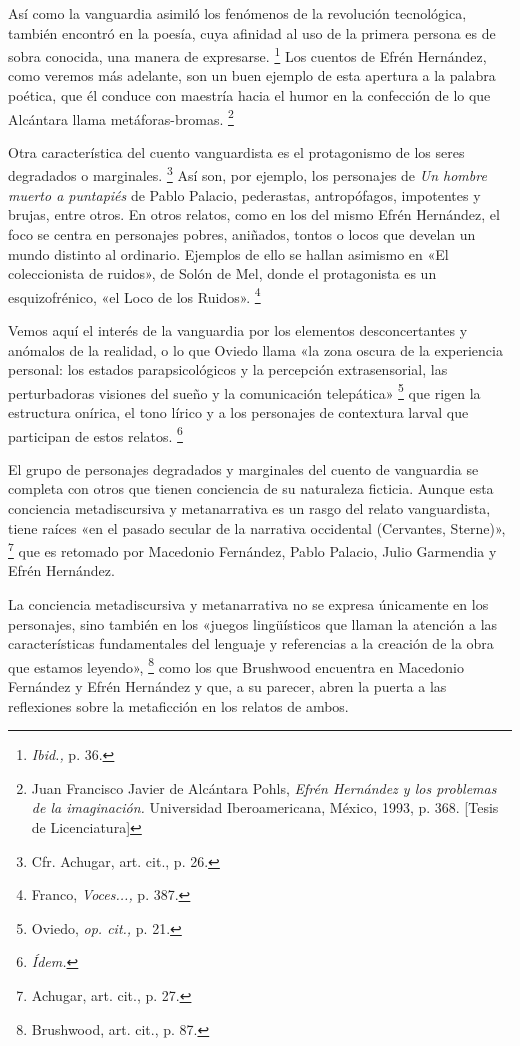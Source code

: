 \documentclass[14pt,twoside,final]{extbook} %
\let\oldfootnote\footnote
\renewcommand\footnote[1]{%
\oldfootnote{\hspace{1mm}#1}}
\begin{document}
Así como la vanguardia asimiló los fenómenos de la revolución tecnológica, también encontró en la poesía, cuya afinidad al uso de la primera persona es de sobra conocida, una manera de expresarse.\footnote{\emph{Ibid.,} p. 36.} Los cuentos de Efrén Hernández, como veremos más adelante, son un buen ejemplo de esta apertura a la palabra poética, que él conduce con maestría hacia el humor en la confección de lo que Alcántara llama metáforas-bromas.\footnote{Juan Francisco Javier de Alcántara Pohls, \emph{Efrén Hernández y los problemas de la imaginación.} Universidad Iberoamericana, México, 1993, p. 368. [Tesis de Licenciatura]}

Otra característica del cuento vanguardista es el protagonismo de los seres degradados o marginales.\footnote{Cfr. Achugar, art. cit., p. 26.} Así son, por ejemplo, los personajes de \emph{Un hombre muerto a puntapiés} de Pablo Palacio, pederastas, antropófagos, impotentes y brujas, entre otros. En otros relatos, como en los del mismo Efrén Hernández, el foco se centra en personajes pobres, aniñados, tontos o locos que develan un mundo distinto al ordinario. Ejemplos de ello se hallan asimismo en «El coleccionista de ruidos», de Solón de Mel, donde el protagonista es un esquizofrénico, «el Loco de los Ruidos».\footnote{Franco, \emph{Voces...,} p. 387.}

Vemos aquí el interés de la vanguardia por los elementos desconcertantes y anómalos de la realidad, o lo que Oviedo llama «la zona oscura de la experiencia personal: los estados parapsicológicos y la percepción extrasensorial, las perturbadoras visiones del sueño y la comunicación telepática»\footnote{Oviedo, \emph{op. cit.,} p. 21.} que rigen la estructura onírica, el tono lírico y a los personajes de contextura larval que participan de estos relatos.\footnote{\em Ídem.}

El grupo de personajes degradados y marginales del cuento de vanguardia se completa con otros que tienen conciencia de su naturaleza ficticia. Aunque esta conciencia metadiscursiva y metanarrativa es un rasgo del relato vanguardista, tiene raíces «en el pasado secular de la narrativa occidental (Cervantes, Sterne)»,\footnote{Achugar, art. cit., p. 27.} que es retomado por Macedonio Fernández, Pablo Palacio, Julio Garmendia y Efrén Hernández.

La conciencia metadiscursiva y metanarrativa no se expresa únicamente en los personajes, sino también en los «juegos lingüísticos que llaman la atención a las características fundamentales del lenguaje
y referencias a la creación de la obra que estamos leyendo»,\footnote{Brushwood, art. cit., p. 87.} como los que Brushwood encuentra en Macedonio Fernández y Efrén Hernández y que, a su parecer, abren la puerta a las reflexiones sobre la metaficción en los relatos de ambos.
\end{document}
